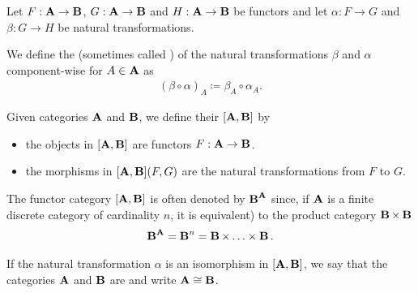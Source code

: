 \begin{definition}\label{def:natural_transformation_composition}
  Let \( F: \operatorname{\mathbf{A}} \to \operatorname{\mathbf{B}} \), \( G: \operatorname{\mathbf{A}} \to \operatorname{\mathbf{B}} \) and \( H: \operatorname{\mathbf{A}} \to \operatorname{\mathbf{B}} \) be functors and let \( \alpha: F \to G \) and \( \beta: G \to H \) be natural transformations.

  We define the  (sometimes called ) of the natural transformations \( \beta \) and \( \alpha \) component-wise for \( A \in \operatorname{\mathbf{A}} \) as
  \begin{align*}
    (\beta \circ \alpha)_A \coloneqq \beta_{A} \circ \alpha_A.
  \end{align*}
\end{definition}

\begin{definition}\label{def:functor_category}
  Given categories \( \operatorname{\mathbf{A}} \) and \( \operatorname{\mathbf{B}} \), we define their  \( [\operatorname{\mathbf{A}}, \operatorname{\mathbf{B}}] \) by
  \begin{itemize}
    \item the objects in \( [\operatorname{\mathbf{A}}, \operatorname{\mathbf{B}}] \) are functors \( F: \operatorname{\mathbf{A}} \to \operatorname{\mathbf{B}} \).
    \item the morphisms in \( [\operatorname{\mathbf{A}}, \operatorname{\mathbf{B}}](F, G) \) are the natural transformations from \( F \) to \( G \).
  \end{itemize}

  The functor category \( [\operatorname{\mathbf{A}}, \operatorname{\mathbf{B}}] \) is often denoted by \( {\operatorname{\mathbf{B}}}^{\operatorname{\mathbf{A}}} \) since, if \( \operatorname{\mathbf{A}} \) is a finite discrete category of cardinality \( n \), it is equivalent) to the product category \( \operatorname{\mathbf{B}} \times \operatorname{\mathbf{B}} \)
  \begin{align*}
    {\operatorname{\mathbf{B}}}^{\operatorname{\mathbf{A}}} = {\operatorname{\mathbf{B}}}^n = \operatorname{\mathbf{B}} \times \ldots \times \operatorname{\mathbf{B}}.
  \end{align*}

  If the natural transformation \( \alpha \) is an isomorphism in \( [\operatorname{\mathbf{A}}, \operatorname{\mathbf{B}}] \), we say that the categories \( \operatorname{\mathbf{A}} \) and \( \operatorname{\mathbf{B}} \) are  and write \( \operatorname{\mathbf{A}} \cong \operatorname{\mathbf{B}} \).
\end{definition}


